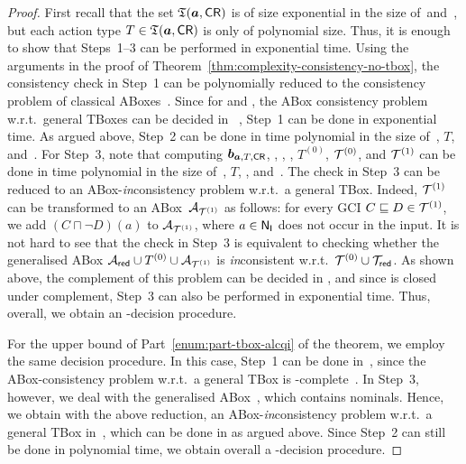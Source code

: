 \begin{proof}
    First recall that the set $\mathfrak{T}(\boldsymbol a,\mathsf{CR})$ is of size exponential in the
    size of~\abf and~\CR, but each action type $T\in\mathfrak{T}(\boldsymbol a,\mathsf{CR})$ is only of
    polynomial size.  Thus, it is enough to show that Steps~1--3 can be
    performed in exponential time.  Using the arguments in the proof of
    Theorem~\ref{thm:complexity-consistency-no-tbox}, the consistency check in
    Step~1 can be polynomially reduced to the consistency problem of classical
    ABoxes~\cite{BLM+-LTCS-05-02}.  Since for \ALCIO and \ALCQO, the ABox
    consistency problem  w.r.t.\ general TBoxes can be decided in
    \ExpTime~\cite{Sch-DKE94,Hla-DPIJCAR04,HoSa-IJCAI01}, Step~1 can be done in
    exponential time.  As argued above, Step~2 can be done in time polynomial in
    the size of~\abf, $T$, and~\CR.  For Step~3, note that computing
    $\boldsymbol b_{\boldsymbol a,T,\mathsf{CR}}$, \Rmc, \Ared, \Tred, $T^{(0)}$, $\mathcal{T}^{(0)}$, and
    $\mathcal{T}^{(1)}$ can be done in time polynomial in the size of~\abf, $T$, \CR,
    and~\Tmc.  The check in Step~3 can be reduced to an
    ABox-\emph{in}consistency problem w.r.t.\ a general TBox.  Indeed,
    $\mathcal{T}^{(1)}$ can be transformed to an ABox~$\mathcal{A}_{\mathcal{T}^{(1)}}$ as follows:
    for every GCI $C\sqsubseteq D\in\mathcal{T}^{(1)}$, we add $(C\sqcap\lnot D)(a)$ to
    $\mathcal{A}_{\mathcal{T}^{(1)}}$, where $a\in\mathsf{N_I}$ does not occur in the input.  It is not
    hard to see that the check in Step~3 is equivalent to checking whether the
    generalised ABox $\mathcal{A}_\mathsf{red}\cup T^{(0)}\cup\mathcal{A}_{\mathcal{T}^{(1)}}$ is
    \emph{in}consistent w.r.t.~$\mathcal{T}^{(0)}\cup\mathcal{T}_\mathsf{red}$.  As shown above, the
    complement of this problem can be decided in \ExpTime, and since \ExpTime is
    closed under complement, Step~3 can also be performed in exponential time.
    Thus, overall, we obtain an \ExpTime-decision procedure.

    For the upper bound of Part~\ref{enum:part-tbox-alcqi} of the theorem, we
    employ the same decision procedure.  In this case, Step~1 can be done
    in~\ExpTime, since the ABox-consistency problem w.r.t.\ a general TBox is
    \ExpTime-complete~\cite{Tob-PhD01}.  In Step~3, however, we deal with the
    generalised ABox~\Ared, which contains nominals.  Hence, we obtain with the
    above reduction, an ABox-\emph{in}consistency problem w.r.t.\ a general TBox
    in~\ALCQIO, which can be done in \coNExpTime as argued above.  Since Step~2
    can still be done in polynomial time, we obtain overall a
    \coNExpTime-decision procedure.


\end{proof}
